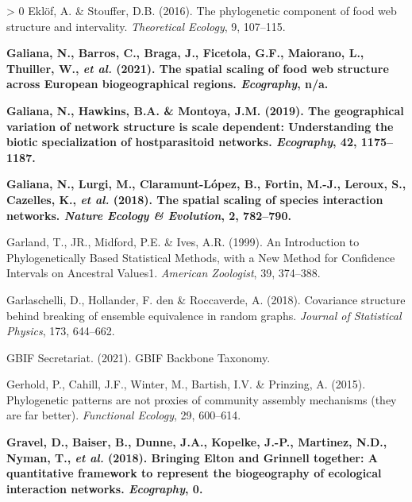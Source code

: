 \documentclass[11pt]{article}
\makeatletter
\def\maxwidth{\ifdim\Gin@nat@width>\linewidth\linewidth
\else\Gin@nat@width\fi}
\let\Oldincludegraphics\includegraphics
\renewcommand{\includegraphics}[1]{\Oldincludegraphics[width=\maxwidth]{#1}}
\newlength{\cslhangindent}
\newenvironment{CSLReferences}[3] %
 {%
  \setlength{\parindent}{0pt}
  \ifodd #1 \everypar{\setlength{\hangindent}{\cslhangindent}}\ignorespaces\fi
  \ifnum #2 > 0
  \setlength{\parskip}{#2\baselineskip}
  \fi
 }%
 {}
\providecommand{\DIFaddtex}[1]{{\bf #1}} %
\providecommand{\DIFaddbegin}{\protect\color{blue}} %
\providecommand{\DIFaddend}{\protect\color{black}} %
\providecommand{\DIFadd}[1]{\texorpdfstring{\DIFaddtex{#1}}{#1}} %
\newcommand{\DIFaddincludegraphics}[2][]{{\color{blue}\fbox{\DIFOincludegraphics[#1]{#2}}}} %
\DeclareRobustCommand{\DIFaddbegin}{\DIFOaddbegin \let\includegraphics\DIFaddincludegraphics} %
\DeclareRobustCommand{\DIFaddend}{\DIFOaddend \let\includegraphics\DIFOincludegraphics} %
\makeatother
\begin{document}
\begin{CSLReferences}{1}{0}
\leavevmode\hypertarget{ref-Eklof2016PhyCom}{}%
Eklöf, A. \& Stouffer, D.B. (2016). The phylogenetic component of food
web structure and intervality. \emph{Theoretical Ecology}, 9, 107--115.

\leavevmode\DIFaddbegin \hypertarget{ref-Galiana2021SpaSca}{}%
\DIFadd{Galiana, N., Barros, C., Braga, J., Ficetola, G.F., Maiorano, L.,
Thuiller, W., \emph{et al.} (2021). The spatial scaling of food web
structure across European biogeographical regions. \emph{Ecography},
n/a.
}

\leavevmode\hypertarget{ref-Galiana2019GeoVar}{}%
\DIFadd{Galiana, N., Hawkins, B.A. \& Montoya, J.M. (2019). The geographical
variation of network structure is scale dependent: Understanding the
biotic specialization of hostparasitoid networks. \emph{Ecography}, 42,
1175--1187.
}

\leavevmode\hypertarget{ref-Galiana2018SpaSca}{}%
\DIFadd{Galiana, N., Lurgi, M., Claramunt-López, B., Fortin, M.-J., Leroux, S.,
Cazelles, K., \emph{et al.} (2018). The spatial scaling of species
interaction networks. \emph{Nature Ecology \& Evolution}, 2, 782--790.
}

\leavevmode\DIFaddend \hypertarget{ref-Garland1999IntPhy}{}%
Garland, T., JR., Midford, P.E. \& Ives, A.R. (1999). An Introduction to
Phylogenetically Based Statistical Methods, with a New Method for
Confidence Intervals on Ancestral Values1. \emph{American Zoologist},
39, 374--388.

\leavevmode\hypertarget{ref-Garlaschelli2018CovStr}{}%
Garlaschelli, D., Hollander, F. den \& Roccaverde, A. (2018). Covariance
structure behind breaking of ensemble equivalence in random graphs.
\emph{Journal of Statistical Physics}, 173, 644--662.

\leavevmode\hypertarget{ref-GBIFSecretariat2021GbiBac}{}%
GBIF Secretariat. (2021). GBIF Backbone Taxonomy.

\leavevmode\hypertarget{ref-Gerhold2015PhyPat}{}%
Gerhold, P., Cahill, J.F., Winter, M., Bartish, I.V. \& Prinzing, A.
(2015). Phylogenetic patterns are not proxies of community assembly
mechanisms (they are far better). \emph{Functional Ecology}, 29,
600--614.

\leavevmode\DIFaddbegin \hypertarget{ref-Gravel2018BriElt}{}%
\DIFadd{Gravel, D., Baiser, B., Dunne, J.A., Kopelke, J.-P., Martinez, N.D.,
Nyman, T., \emph{et al.} (2018). Bringing Elton and Grinnell together: A
quantitative framework to represent the biogeography of ecological
interaction networks. \emph{Ecography}, 0.
}


\end{CSLReferences}
\end{document}

